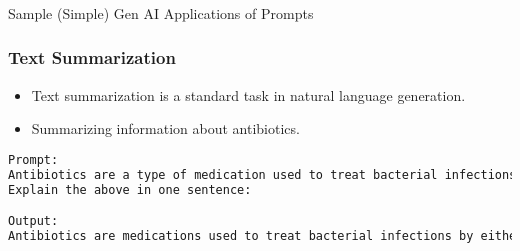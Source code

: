 



\begin{frame}[fragile]\frametitle{}
\begin{center}
{\Large Sample (Simple) Gen AI Applications of Prompts}
\end{center}
\end{frame}

\begin{frame}[fragile]\frametitle{Text Summarization}
\begin{itemize}
    \item Text summarization is a standard task in natural language generation.
    \item Summarizing information about antibiotics.
\end{itemize}
\begin{lstlisting}[language=HTML]
Prompt:
Antibiotics are a type of medication used to treat bacterial infections. They work by either killing the bacteria or preventing them from reproducing, allowing the bodys immune system to fight off the infection. Antibiotics are usually taken orally in the form of pills, capsules, or liquid solutions, or sometimes administered intravenously. They are not effective against viral infections, and using them inappropriately can lead to antibiotic resistance.
Explain the above in one sentence:

Output:
Antibiotics are medications used to treat bacterial infections by either killing the bacteria or stopping them from reproducing, but they are not effective against viruses and overuse can lead to antibiotic resistance.
\end{lstlisting}
\end{frame}


